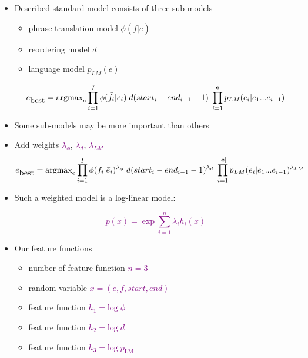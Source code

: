 \documentclass[landscape]{slides}
\newcommand{\maths}[1]{\textcolor{purple}{#1}}
\begin{document}
\begin{itemize}
\item Described standard model consists of three sub-models \vspace{-3mm}
\begin{itemize}
\item phrase translation model  $\phi(\bar{f}|\bar{e})$
\item reordering model $d$
\item language model $p_{LM}(e)$
\end{itemize} \vspace{-6mm}
\maths{\begin{equation*}
e_{\mbox{best}} = \mbox{argmax}_e \prod_{i=1}^I \phi(\bar{f}_i|\bar{e}_i) \; d(start_i-end_{i-1}-1) \; \prod_{i=1}^{|{\bf e}|} p_{LM}(e_i|e_1...e_{i-1})
\end{equation*}} \vspace{-5mm}
\item Some sub-models may be more important than others
\item Add weights \maths{$\lambda_{\phi}$}, \maths{$\lambda_{d}$}, \maths{$\lambda_{LM}$}\vspace{-5mm}
\maths{\begin{equation*}
e_{\mbox{best}} = \mbox{argmax}_e \prod_{i=1}^I \phi(\bar{f}_i|\bar{e}_i)^{\lambda_{\phi}} \; d(start_i-end_{i-1}-1)^{\lambda_{d}} \; \prod_{i=1}^{|{\bf e}|} p_{LM}(e_i|e_1...e_{i-1})^{\lambda_{LM}}
\end{equation*}}
\end{itemize}


\begin{itemize}
\item Such a weighted model is a log-linear model:

\maths{\begin{equation*}
p(x) = \exp \sum_{i=1}^n \lambda_i h_i(x)
\end{equation*}}

\item Our feature functions
\begin{itemize} \itemsep 3pt
\item number of feature function \maths{$n=3$}
\item random variable \maths{$x=(e,f,start,end)$}
\item feature function \maths{$h_1 = \mbox{log}\; \phi$}
\item feature function \maths{$h_2 = \mbox{log}\; d$}
\item feature function \maths{$h_3 = \mbox{log}\; p_{\mbox{LM}}$}
\end{itemize}
\end{itemize}
\end{document}
